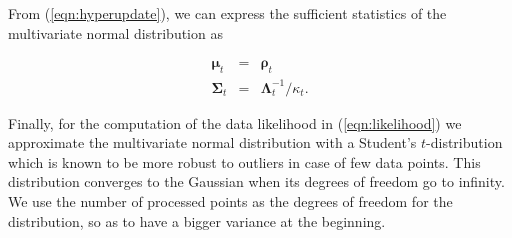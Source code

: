 From (\ref{eqn:hyperupdate}), we can express the sufficient statistics of the
multivariate normal distribution as

\begin{eqnarray}
\label{eqn:ssmvn}
\boldsymbol{\mu}_t &=& \boldsymbol{\rho}_t\nonumber\\
\boldsymbol{\Sigma}_t &=& \boldsymbol{\Lambda}_t^{-1} / \kappa_t.
\end{eqnarray}

Finally, for the computation of the data likelihood in
(\ref{eqn:likelihood}) we approximate the multivariate normal
distribution with a Student's $t$-distribution which is known to be
more robust to outliers in case of few data points. This distribution
converges to the Gaussian when its degrees of freedom go to infinity.
We use the number of processed points as the degrees of freedom for
the distribution, so as to have a bigger variance at the beginning.
